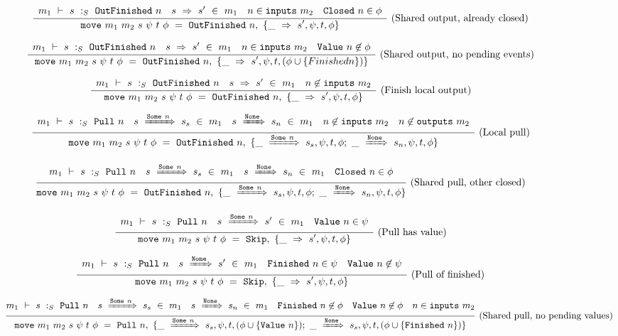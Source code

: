 \begin{figure*}
$$
\frac {\displaystyle 
    \begin{array}{lccr}  m_1 ~\vdash~ s ~:_S~ \mathtt{OutFinished}~n  &  s ~\Rightarrow~ s' ~\in~m_1  &  n \in \mathtt{inputs}~m_2  &  \mathtt{Closed}~n \in \phi  \end{array}
} {\displaystyle 
    \mathtt{move}~m_1~m_2~s~\psi~t~\phi~=~\mathtt{OutFinished}~n,~\{\_~\Rightarrow~s',\psi,t,\phi\}
} \ 
\textrm{(Shared output, already closed)}
$$

$$
\frac {\displaystyle 
    \begin{array}{lccr}  m_1 ~\vdash~ s ~:_S~ \mathtt{OutFinished}~n  &  s ~\Rightarrow~ s' ~\in~m_1  &  n \in \mathtt{inputs}~m_2  &  \mathtt{Value}~n \not\in \phi  \end{array}
} {\displaystyle 
    \mathtt{move}~m_1~m_2~s~\psi~t~\phi~=~\mathtt{OutFinished}~n,~\{\_~\Rightarrow~s',\psi,t,(\phi \cup \{ Finished{n} \})\}
} \ 
\textrm{(Shared output, no pending events)}
$$

$$
\frac {\displaystyle 
    \begin{array}{lcr}  m_1 ~\vdash~ s ~:_S~ \mathtt{OutFinished}~n  &  s ~\Rightarrow~ s' ~\in~m_1  &  n \not\in \mathtt{inputs}~m_2  \end{array}
} {\displaystyle 
    \mathtt{move}~m_1~m_2~s~\psi~t~\phi~=~\mathtt{OutFinished}~n,~\{\_~\Rightarrow~s',\psi,t,\phi\}
} \ 
\textrm{(Finish local output)}
$$

$$
\frac {\displaystyle 
    \begin{array}{lcccr}  m_1 ~\vdash~ s ~:_S~ \mathtt{Pull}~n  &  s ~\xRightarrow{\mathtt{Some}~n}~ s_s ~\in~m_1  &  s ~\xRightarrow{\mathtt{None}}~ s_n ~\in~m_1  &  n \not\in \mathtt{inputs}~m_2  &  n \not\in \mathtt{outputs}~m_2  \end{array}
} {\displaystyle 
    \mathtt{move}~m_1~m_2~s~\psi~t~\phi~=~\mathtt{OutFinished}~n,~\{ \_~\xRightarrow{\mathtt{Some}~n}~s_s, \psi, t, \phi
         ;~
          \_~\xRightarrow{\mathtt{None}}~s_n, \psi, t, \phi \}
} \ 
\textrm{(Local pull)}
$$

$$
\frac {\displaystyle 
    \begin{array}{lccr}  m_1 ~\vdash~ s ~:_S~ \mathtt{Pull}~n  &  s ~\xRightarrow{\mathtt{Some}~n}~ s_s ~\in~m_1  &  s ~\xRightarrow{\mathtt{None}}~ s_n ~\in~m_1  &  \mathtt{Closed}~n \in \phi  \end{array}
} {\displaystyle 
    \mathtt{move}~m_1~m_2~s~\psi~t~\phi~=~\mathtt{OutFinished}~n,~\{ \_~\xRightarrow{\mathtt{Some}~n}~s_s, \psi, t, \phi
         ;~
          \_~\xRightarrow{\mathtt{None}}~s_n, \psi, t, \phi \}
} \ 
\textrm{(Shared pull, other closed)}
$$


$$
\frac {\displaystyle 
    \begin{array}{lcr}  m_1 ~\vdash~ s ~:_S~ \mathtt{Pull}~n  &  s ~\xRightarrow{\mathtt{Some}~n}~ s' ~\in~m_1  &  \mathtt{Value}~n \in \psi  \end{array}
} {\displaystyle 
    \mathtt{move}~m_1~m_2~s~\psi~t~\phi~=~\mathtt{Skip},~\{ \_~\Rightarrow~s',\psi,t,\phi \}
} \ 
\textrm{(Pull has value)}
$$

$$
\frac {\displaystyle 
    \begin{array}{lccr}  m_1 ~\vdash~ s ~:_S~ \mathtt{Pull}~n  &  s ~\xRightarrow{\mathtt{None}}~ s' ~\in~m_1  &  \mathtt{Finished}~n \in \psi  &  \mathtt{Value}~n \not\in \psi  \end{array}
} {\displaystyle 
    \mathtt{move}~m_1~m_2~s~\psi~t~\phi~=~\mathtt{Skip},~\{ \_~\Rightarrow~s',\psi,t,\phi \}
} \ 
\textrm{(Pull of finished)}
$$

$$
\frac {\displaystyle 
        m_1 ~\vdash~ s ~:_S~ \mathtt{Pull}~n
        \quad
        s ~\xRightarrow{\mathtt{Some}~n}~ s_s ~\in~m_1
        \quad
        s ~\xRightarrow{\mathtt{None}}~ s_n ~\in~m_1
        \quad
        \mathtt{Finished}~n \not\in \phi
        \quad
        \mathtt{Value}~n \not\in \phi
        \quad
        n \in \mathtt{inputs}~m_2
} {\displaystyle 
    \mathtt{move}~m_1~m_2~s~\psi~t~\phi~=~\mathtt{Pull}~n,~\{ \_~\xRightarrow{\mathtt{Some}~n}~s_s, \psi, t, (\phi \cup \{ \mathtt{Value}~n \}) 
         ;~
          \_~\xRightarrow{\mathtt{None}}~s_s, \psi, t, (\phi \cup \{ \mathtt{Finished}~n \}) 
         \}
} \ 
\textrm{(Shared pull, no pending values)}
$$


\end{figure*}

